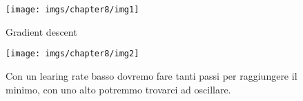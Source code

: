 	\begin{figure}
		\centering
		\begin{minipage}{.5\textwidth}
			\centering
			\texttt{[image: imgs/chapter8/img1]}
			\caption{Gradient descent}
			\label{fig:chapter08-01}
		\end{minipage}%
		\begin{minipage}{.5\textwidth}
			\centering
			\texttt{[image: imgs/chapter8/img2]}
			\caption{Con un learing rate basso dovremo fare tanti passi per raggiungere il minimo, con uno alto potremmo trovarci ad oscillare.}
			\label{fig:chapter08-02}
		\end{minipage}
	\end{figure}

